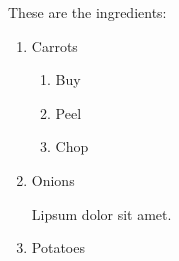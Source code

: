 \documentclass{article}
\begin{document}
These are the ingredients:
\begin{enumerate}
    \item Carrots
    \begin{enumerate}
        \item Buy
        \item Peel
        \item Chop
    \end{enumerate}
    \item Onions
    
    Lipsum dolor sit amet.
    \item Potatoes
\end{enumerate}
\end{document}
